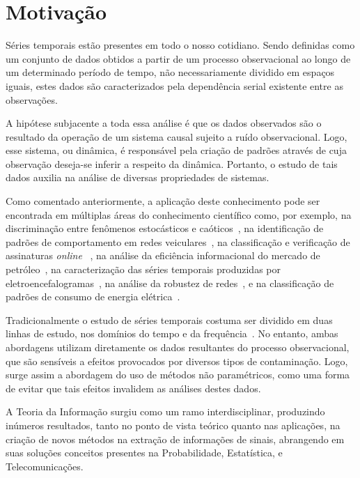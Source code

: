  

\section{Motivação}

Séries temporais estão presentes em todo o nosso cotidiano. Sendo definidas como um conjunto de dados obtidos a partir de um processo observacional ao longo de um determinado período de tempo, não necessariamente dividido em espaços iguais, estes dados são caracterizados pela dependência serial existente entre as observações.

A hipótese subjacente a toda essa análise é que os dados observados são o resultado da operação de um sistema causal sujeito a ruído observacional. Logo, esse sistema, ou dinâmica, é responsável pela criação de padrões através de cuja observação deseja-se inferir a respeito da dinâmica. Portanto, o estudo de tais dados auxilia na análise de diversas propriedades de sistemas. 

Como comentado anteriormente, a aplicação deste conhecimento pode ser encontrada em múltiplas áreas do conhecimento científico como, por exemplo, 
na discriminação entre fenômenos estocásticos e caóticos~\cite{DistinguishingNoiseFromChaos}, 
na identificação de padrões de comportamento em redes veiculares~\cite{CharacterizationVehicleBehaviorInformationTheory}, 
na classificação e verificação de assinaturas \textit{online} ~\cite{ClassificationVerificationOnlineHandwrittenSignatures},
na análise da eficiência informacional do mercado de petróleo~\cite{oilMarket},
na caracterização das séries temporais produzidas por eletroencefalogramas~\cite{EGGTimeSeries},
na análise da robustez de redes~\cite{InformationTheoryPerspectiveNetworkRobustness}, e 
na classificação de padrões de consumo de energia elétrica~\cite{CharacterizationElectricLoadInformationTheoryQuantifiers}.

Tradicionalmente o estudo de séries temporais costuma ser dividido em duas linhas de estudo, nos domínios do tempo e da frequência~\cite{BrockwellDavis91}. No entanto, ambas abordagens utilizam diretamente os dados resultantes do processo observacional, que são sensíveis a efeitos provocados por diversos tipos de contaminação. Logo, surge assim a abordagem do uso de métodos não paramétricos, como uma forma de evitar que tais efeitos invalidem as análises destes dados.

A Teoria da Informação surgiu como um ramo interdisciplinar, produzindo inúmeros resultados, tanto no ponto de vista teórico quanto nas aplicações, na criação de novos métodos na extração de informações de sinais, abrangendo em suas soluções conceitos presentes na Probabilidade, Estatística, e Telecomunicações. 

